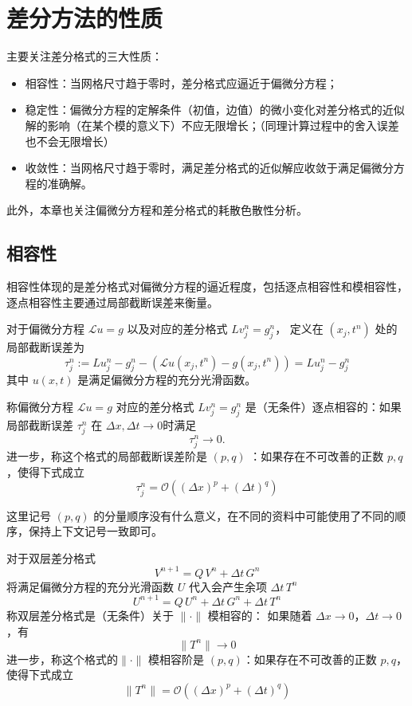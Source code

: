 \chapter{差分方法的性质}

主要关注差分格式的三大性质：
\begin{itemize}
    \item 相容性：当网格尺寸趋于零时，差分格式应逼近于偏微分方程；
    \item 稳定性：偏微分方程的定解条件（初值，边值）的微小变化对差分格式的近似解的影响（在某个模的意义下）不应无限增长；（同理计算过程中的舍入误差也不会无限增长）
    \item 收敛性：当网格尺寸趋于零时，满足差分格式的近似解应收敛于满足偏微分方程的准确解。
\end{itemize}
此外，本章也关注偏微分方程和差分格式的耗散色散性分析。

\section{相容性}

相容性体现的是差分格式对偏微分方程的逼近程度，包括逐点相容性和模相容性，逐点相容性主要通过局部截断误差来衡量。

\begin{definition}[局部截断误差]
    对于偏微分方程 $\mathcal{L} u = g$ 以及对应的差分格式 $L v_j^n = g_j^n$，
    定义在 $(x_j,t^n)$ 处的局部截断误差为
    \[
        \tau_j^n := L u_j^n - g_j^n - (\mathcal{L}u(x_j,t^n) - g(x_j,t^n)) = L u_j^n - g_j^n
    \]
    其中 $u(x,t)$ 是满足偏微分方程的充分光滑函数。
\end{definition}

\begin{definition}[逐点相容性]
    称偏微分方程 $\mathcal{L} u = g$ 对应的差分格式 $L v_j^n = g_j^n$ 是（无条件）逐点相容的：如果局部截断误差 $\tau_j^n$ 在
    $\Delta x,\Delta t\to 0$时满足
    \[
        \tau_j^n \to 0.
    \]
    进一步，称这个格式的局部截断误差阶是 $(p,q)$ ：如果存在不可改善的正数 $p,q$，使得下式成立
    \[
        \tau_j^n = \mathcal{O}((\Delta x)^p + (\Delta t)^q)
    \]
\end{definition}

\begin{remark}
    这里记号 $(p,q)$ 的分量顺序没有什么意义，在不同的资料中可能使用了不同的顺序，保持上下文记号一致即可。
\end{remark}

\begin{definition}[模相容性]\label{def:consistency-norm}
    对于双层差分格式
    \[
        V^{n+1} = Q \, V^{n} + \Delta t\, G^{n}
    \]
    将满足偏微分方程的充分光滑函数 $U$ 代入会产生余项 $\Delta t\,T^{n}$
    \[
        U^{n+1} = Q \, U^{n} + \Delta t\, G^{n} + \Delta t\, T^{n}
    \]
    称双层差分格式是（无条件）关于 $\|\cdot\|$ 模相容的：
    如果随着 $\Delta x \to 0$，$\Delta t \to 0$，有
    \[
        \|T^{n}\|  \to 0
    \]
    进一步，称这个格式的$\|\cdot\|$ 模相容阶是 $(p,q)$：如果存在不可改善的正数 $p,q$，使得下式成立
    \[
        \|T^{n}\|  = \mathcal{O}((\Delta x)^p + (\Delta t)^q)
    \]
\end{definition}

